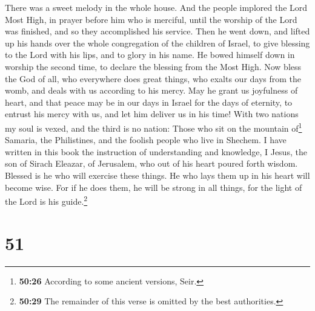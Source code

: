 There was a sweet melody in the whole house.  And the
people implored the Lord Most High, in prayer before him who is
merciful, until the worship of the Lord was finished, and so they
accomplished his service.  Then he went down, and lifted
up his hands over the whole congregation of the children of Israel, to
give blessing to the Lord with his lips, and to glory in his name.
 He bowed himself down in worship the second time, to
declare the blessing from the Most High.  Now bless the
God of all, who everywhere does great things, who exalts our days from
the womb, and deals with us according to his mercy.  May
he grant us joyfulness of heart, and that peace may be in our days in
Israel for the days of eternity,  to entrust his mercy
with us, and let him deliver us in his time!  With two
nations my soul is vexed, and the third is no nation: 
Those who sit on the mountain of\footnote{\textbf{50:26} According to
  some ancient versions, Seir.} Samaria, the Philistines, and the
foolish people who live in Shechem.  I have written in
this book the instruction of understanding and knowledge, I Jesus, the
son of Sirach Eleazar, of Jerusalem, who out of his heart poured forth
wisdom.  Blessed is he who will exercise these things. He
who lays them up in his heart will become wise.  For if
he does them, he will be strong in all things, for the light of the Lord
is his guide.\footnote{\textbf{50:29} The remainder of this verse is
  omitted by the best authorities.}

\hypertarget{section-36}{%
\section{51}\label{section-36}}

